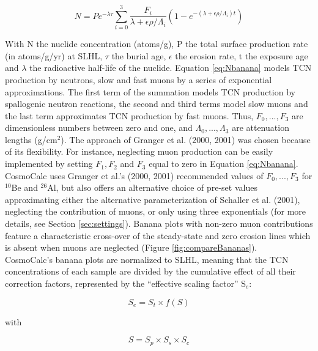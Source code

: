 \documentclass{article}
\begin{document}
\begin{equation}
  \label{eq:Nbanana}
N = P e^{- \lambda \tau}
\sum_{i=0}^3
\frac{F_i}{\lambda + \epsilon \rho / \Lambda_i}
\left( 1 - e^{- \left( \lambda + \epsilon \rho / \Lambda_i \right) t} \right)
\end{equation}

With  N  the nuclide  concentration  (atoms/g),  P  the total  surface
production  rate  (in atoms/g/yr)  at  SLHL,  $\tau$  the burial  age,
$\epsilon$  the erosion  rate, t  the exposure  age and  $\lambda$ the
radioactive  half-life  of  the  nuclide.   Equation  \ref{eq:Nbanana}
models TCN production by neutrons, slow  and fast muons by a series of
exponential approximations.   The first  term of the  summation models
TCN production by spallogenic  neutron reactions, the second and third
terms model slow  muons and the last term  approximates TCN production
by fast muons.  Thus,  $F_0,...,F_3$ are dimensionless numbers between
zero  and one, and  $\Lambda_0,...,\Lambda_3$ are  attenuation lengths
(g/cm$^2$).  The approach  of Granger et al.  (2000,  2001) was chosen
because of its flexibility.   For instance, neglecting muon production
can be easily implemented by setting $F_1,F_2$ and $F_3$ equal to zero
in Equation \ref{eq:Nbanana}.  CosmoCalc  uses Granger et al.'s (2000,
2001) recommended values of $F_0,...,F_3$ for $^{10}$Be and $^{26}$Al,
but also offers an  alternative choice of pre-set values approximating
either  the alternative  parameterization of  Schaller et  al. (2001),
neglecting the contribution of muons, or only using three exponentials
(for more details, see  Section \ref{sec:settings}). Banana plots with
non-zero muon contributions feature a characteristic cross-over of the
steady-state and  zero erosion  lines which is  absent when  muons are
neglected (Figure \ref{fig:compareBananas}).
\\

CosmoCalc's banana plots are normalized  to SLHL, meaning that the TCN
concentrations of each sample are  divided by the cumulative effect of
all their  correction factors, represented by  the ``effective scaling
factor'' S$_e$:

\begin{equation}
  \label{eq:Se}
S_e = S_t \times f(S)
\end{equation}

with

\begin{equation}
   \label{eq:S}
S = S_p \times S_s \times S_c
\end{equation}
\end{document}
